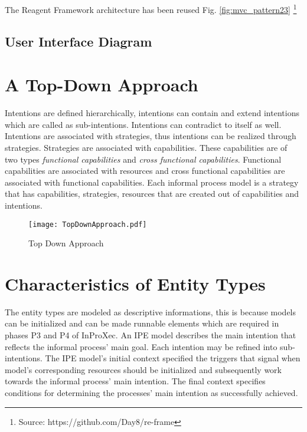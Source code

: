 The Reagent Framework architecture has been reused Fig. \ref{fig:mvc_pattern23} \footnote{Source: https://github.com/Day8/re-frame}




\subsection{User Interface Diagram}
\label{sec:uidiagram}

\section{A Top-Down Approach}
\label{sec:topdownapproach}
Intentions are defined hierarchically, intentions can contain and extend intentions which are called as sub-intentions. Intentions can contradict to itself as well. Intentions are associated with strategies, thus intentions can be realized through strategies. Strategies are associated with capabilities. These capabilities are of two types \textit{functional capabilities} and \textit{cross functional capabilities}. Functional capabilities are associated with resources and cross functional capabilities are associated with functional capabilities. Each informal process model is a strategy that has capabilities, strategies, resources that are created out of capabilities and intentions. 

\begin{figure}
	\centering
	\texttt{[image: TopDownApproach.pdf]}
	\caption{Top Down Approach}
	\label{fig:topdownapproach}
\end{figure}



\section{Characteristics of Entity Types}
\label{sec:enttyperelation}
The entity types are modeled as descriptive informations, this is because models can be initialized and can be made runnable elements which are required in phases P3 and P4 of InProXec. An IPE model describes the main intention that reflects the informal process' main goal. Each intention may be refined into sub-intentions. The IPE model's initial context specified the triggers that signal when model's corresponding resources should be initialized and subsequently work towards the informal process' main intention\cite{Sungur2015a}. The final context specifies conditions for determining the processes' main intention as successfully achieved. 



